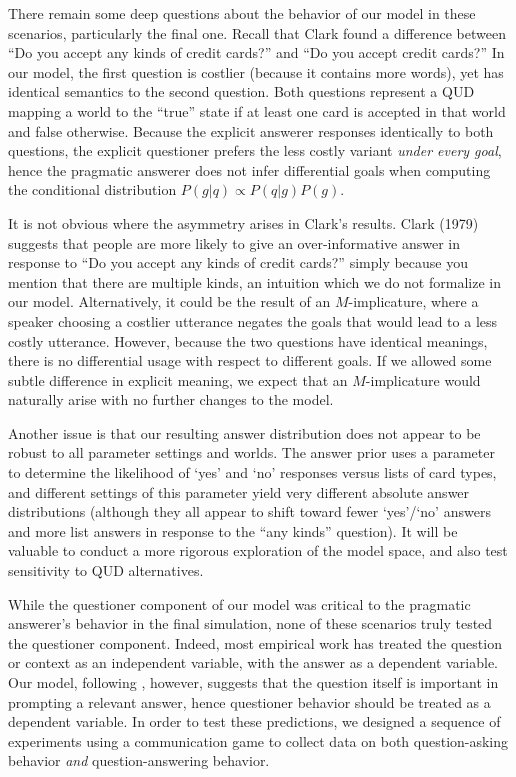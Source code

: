 \documentclass[12pt, floatsintext, jou]{apa6}
\begin{document}
There remain some deep questions about the behavior of our model in these scenarios, particularly the final one. Recall that Clark found a difference between ``Do you accept any kinds of credit cards?'' and ``Do you accept credit cards?'' In our model, the first question is costlier (because it contains more words), yet has identical semantics to the second question. Both questions represent a QUD mapping a world to the ``true'' state if at least one card is accepted in that world and false otherwise. Because the explicit answerer responses identically to both questions, the explicit questioner prefers the less costly variant \emph{under every goal}, hence the pragmatic answerer does not infer differential goals when computing the conditional distribution $P(g | q) \propto P(q | g) P(g)$. 

It is not obvious where the asymmetry arises in Clark's results. Clark (1979) suggests that people are more likely to give an over-informative answer in response to ``Do you accept any kinds of credit cards?'' simply because you mention that there are multiple kinds, an intuition which we do not formalize in our model. Alternatively, it could be the result of an $M$-implicature, where a speaker choosing a costlier utterance negates the goals that would lead to a less costly utterance. However, because the two questions have identical meanings, there is no differential usage with respect to different goals. If we allowed some subtle difference in explicit meaning, we expect that an $M$-implicature would naturally arise with no further changes to the model.

Another issue is that our resulting answer distribution does not appear to be robust to all parameter settings and worlds. The answer prior uses a parameter to determine the likelihood of `yes' and `no' responses versus lists of card types, and different settings of this parameter yield very different absolute answer distributions (although they all appear to shift toward fewer `yes'/`no' answers and more list answers in response to the ``any kinds'' question). It will be valuable to conduct a more rigorous exploration of the model space, and also test sensitivity to QUD alternatives. 

While the questioner component of our model was critical to the pragmatic answerer's behavior in the final simulation, none of these scenarios truly tested the questioner component.  Indeed, most empirical work has treated the question or context as an independent variable, with the answer as a dependent variable. Our model, following , however, suggests that the question itself is important in prompting a relevant answer, hence questioner behavior should be treated as a dependent variable. In order to test these predictions, we designed a sequence of experiments using a communication game to collect data on both question-asking behavior \emph{and} question-answering behavior.
\end{document}
